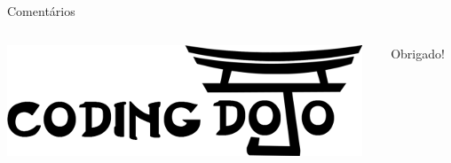 \documentclass[10pt]{beamer}
\begin{document}
\begin{frame}{Coment\'arios}
	\begin{columns}
		\begin{column}{2cm}
			\centering
			\vskip 0.5cm
			\includegraphics[height=0.7\textwidth]{figuras/dojos.png}
		\end{column}
		\begin{column}{6cm}
			\centering
			\vskip 0.5cm
			\Huge Obrigado!
		\end{column}
	\end{columns}
\end{frame}
\end{document}
